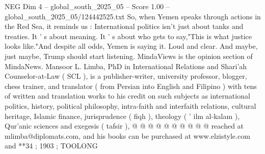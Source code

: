 \begin{textsample}{NEG Dim 4 – global\_south\_2025\_05 – Score 1.00 – global\_south\_2025\_05/124442525.txt}
So, when Yemen speaks through actions in the Red Sea, it reminds us : International politics isn't just about tanks and treaties.
It ' s about meaning.
It ' s about who gets to say,"This is what justice looks like."And despite all odds, Yemen is saying it.
Loud and clear.
And maybe, just maybe, Trump should start listening.
MindaViews is the opinion section of MindaNews.
Mansoor L.
Limba, PhD in International Relations and Shari'ah Counselor-at-Law ( SCL ), is a publisher-writer, university professor, blogger, chess trainer, and translator ( from Persian into English and Filipino ) with tens of written and translation works to his credit on such subjects as international politics, history, political philosophy, intra-faith and interfaith relations, cultural heritage, Islamic finance, jurisprudence ( fiqh ), theology ( ' ilm al-kalam ), Qur'anic sciences and exegesis ( tafsir ), @ @ @ @ @ @ @ @ @ @ reached at mlimba@diplomats.com, and his books can be purchased at www.elzistyle.com and **34 ; 1903 ; TOOLONG

\end{textsample}
